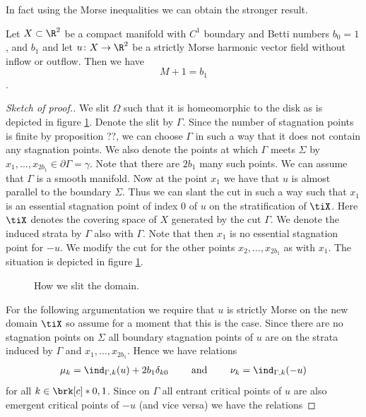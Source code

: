 In fact using the Morse inequalities we can obtain the stronger result.
\begin{proposition}
  Let $X\subset\R^2$ be a compact manifold with $C^1$ boundary and Betti numbers $b_0=1$, and $b_1$
  and let $u\colon X\to\R^2$ be 
  a strictly Morse harmonic vector field without inflow or outflow.
  Then we have $$M+1=b_1$$.
\end{proposition}
\begin{proof}[Sketch of proof.]
  We slit $\Omega$ such that it is homeomorphic to the disk as is 
  depicted in figure \ref{fi:n2_hvf_slitDomain}.
  Denote the slit by $\Gamma$. Since the number of stagnation points is 
  finite by proposition ??, we can choose $\Gamma$ in such a way that it does not contain
  any stagnation points.
  We also denote the points at which
  $\Gamma$ meets $\Sigma$ by $x_1,\dots,x_{2b_1}\in\partial\Gamma=\gamma$.
  Note that there are $2b_1$ many such points.
  We can assume that $\Gamma$ is a smooth manifold. Now at the point $x_1$
  we have that $u$ is almost parallel to the boundary $\Sigma$. Thus we can slant
  the cut in such a way such that $x_1$ is an essential stagnation point of index $0$ of $u$ on the stratification
  of $\tiX$. Here $\tiX$ denotes the covering space of $X$ generated by the cut $\Gamma$.
  We denote the induced strata by $\Gamma$ also with $\Gamma$. Note that then $x_1$ is no
  essential stagnation point for $-u$.
  We modify the cut for the other points $x_2,\dots,x_{2b_1}$ as with $x_1$.
  The situation is depicted in figure \ref{fi:n2_hvf_slitDomain}.
  \begin{figure}
    \centering
    
    \caption{How we slit the domain.}
    \label{fi:n2_hvf_slitDomain}
  \end{figure}
  For the following argumentation we require that $u$ is strictly Morse on the new domain $\tiX$ 
  so assume for a moment that this is the case.
  Since there are no stagnation points on $\Sigma$ all boundary stagnation points of $u$ are on
  the strata induced by $\Gamma$ and $x_1,\dots,x_{2b_1}$. Hence we have relations
  \begin{align}
    \mu_k=\ind_{\Gamma,k}(u)+2b_1\delta_{k0} \qquad\text{ and }\qquad
    \nu_k=\ind_{\Gamma,k}(-u)\label{eq:n2_hvf_noInflowNoOutflow_relationsMuIndex}
  \end{align}
  for all $k\in\brk[c]*{0,1}$.
  Since on $\Gamma$ all entrant critical points of $u$ are also emergent
  critical points of $-u$ (and vice versa) we have the relations

\end{proof}
